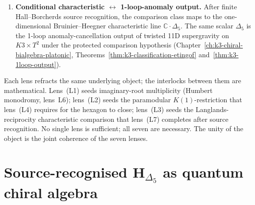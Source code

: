 \begin{remark}
\begin{enumerate}[label=\textup{(L\arabic*)}]
 and the Lusztig order \(\ell=8\) are compared on the fixed K3 branch.
 Bruinier's Heegner Chern-class formula supplies the automorphic side only.
\item \textbf{Conditional characteristic $\leftrightarrow$ 1-loop-anomaly output.}
 After finite Hall--Borcherds source recognition, the comparison class maps to
 the one-dimensional Bruinier--Heegner characteristic line
 $\mathbb{C}\cdot\Delta_5$. The same scalar $\Delta_5$ is the
 1-loop anomaly-cancellation output of twisted 11D supergravity on
 $K3\times T^2$ under the protected comparison hypothesis
 (Chapter~\ref{ch:k3-chiral-bialgebra-platonic},
 Theorems~\ref{thm:k3-classification-etingof}
 and~\ref{thm:k3-1loop-output}).
\end{enumerate}
Each lens refracts the same underlying object; the interlocks between them
are mathematical. Lens~(L1) seeds imaginary-root multiplicity
(Humbert monodromy, lens~L6); lens~(L2) seeds the paramodular
$K(1)$-restriction that lens~(L4) requires for the hexagon to close;
lens~(L3) seeds the Langlands-reciprocity characteristic comparison
that lens~(L7) completes after source recognition. No single lens is
sufficient; all seven are necessary. The
unity of the object is the joint coherence of the seven lenses.
\end{remark}

\section{Source-recognised \texorpdfstring{$\mathbf H_{\Delta_5}$}{H-Delta-5} as quantum chiral algebra}
\label{sec:qca-hdelta5-quantum-chiral-algebra}

